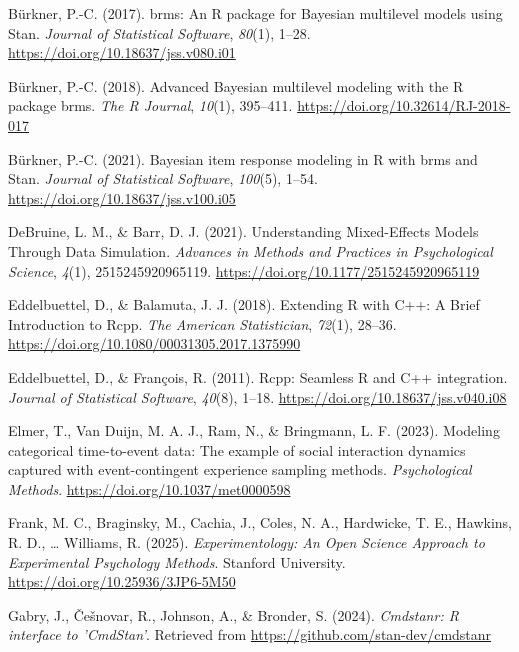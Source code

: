 \documentclass[
  man, donotrepeattitle,floatsintext]{apa6}
\newlength{\cslhangindent}
\newenvironment{CSLReferences}[2] %
 {\begin{list}{}{%
  \setlength{\itemindent}{0pt}
  \setlength{\leftmargin}{0pt}
  \setlength{\parsep}{0pt}
  \ifodd #1
   \setlength{\leftmargin}{\cslhangindent}
   \setlength{\itemindent}{-1\cslhangindent}
  \fi
  \setlength{\itemsep}{#2\baselineskip}}}
 {\end{list}}
\begin{document}
\begin{CSLReferences}{1}{0}
Bürkner, P.-C. (2017). {brms}: An {R} package for {Bayesian} multilevel models using {Stan}. \emph{Journal of Statistical Software}, \emph{80}(1), 1--28. \url{https://doi.org/10.18637/jss.v080.i01}

Bürkner, P.-C. (2018). Advanced {Bayesian} multilevel modeling with the {R} package {brms}. \emph{The R Journal}, \emph{10}(1), 395--411. \url{https://doi.org/10.32614/RJ-2018-017}

Bürkner, P.-C. (2021). Bayesian item response modeling in {R} with {brms} and {Stan}. \emph{Journal of Statistical Software}, \emph{100}(5), 1--54. \url{https://doi.org/10.18637/jss.v100.i05}

DeBruine, L. M., \& Barr, D. J. (2021). Understanding {Mixed-Effects Models Through Data Simulation}. \emph{Advances in Methods and Practices in Psychological Science}, \emph{4}(1), 2515245920965119. \url{https://doi.org/10.1177/2515245920965119}

Eddelbuettel, D., \& Balamuta, J. J. (2018). {Extending {R} with {C++}: A Brief Introduction to {Rcpp}}. \emph{The American Statistician}, \emph{72}(1), 28--36. \url{https://doi.org/10.1080/00031305.2017.1375990}

Eddelbuettel, D., \& François, R. (2011). {Rcpp}: Seamless {R} and {C++} integration. \emph{Journal of Statistical Software}, \emph{40}(8), 1--18. \url{https://doi.org/10.18637/jss.v040.i08}

Elmer, T., Van Duijn, M. A. J., Ram, N., \& Bringmann, L. F. (2023). Modeling categorical time-to-event data: {The} example of social interaction dynamics captured with event-contingent experience sampling methods. \emph{Psychological Methods}. \url{https://doi.org/10.1037/met0000598}

Frank, M. C., Braginsky, M., Cachia, J., Coles, N. A., Hardwicke, T. E., Hawkins, R. D., \ldots{} Williams, R. (2025). \emph{{Experimentology: An Open Science Approach to Experimental Psychology Methods}}. Stanford University. \url{https://doi.org/10.25936/3JP6-5M50}

Gabry, J., Češnovar, R., Johnson, A., \& Bronder, S. (2024). \emph{Cmdstanr: R interface to 'CmdStan'}. Retrieved from \url{https://github.com/stan-dev/cmdstanr}


\end{CSLReferences}
\end{document}
